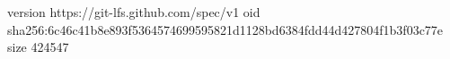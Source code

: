 version https://git-lfs.github.com/spec/v1
oid sha256:6c46c41b8e893f5364574699595821d1128bd6384fdd44d427804f1b3f03c77e
size 424547
